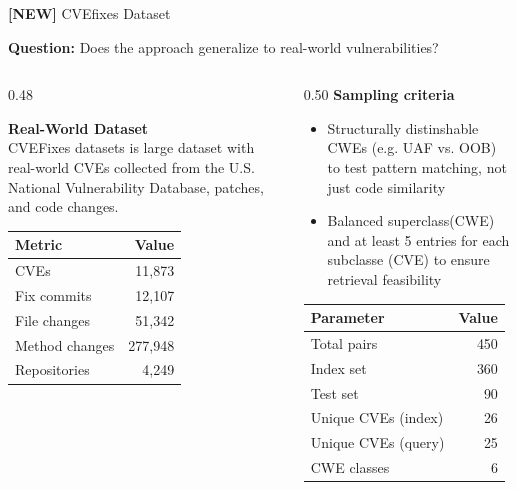 \documentclass[aspectratio=169,10pt]{beamer}
\begin{document}
\begin{frame}{\textbf{[NEW]} CVEfixes Dataset }
  
  \textbf{Question:} Does the approach generalize to real-world vulnerabilities?
  \vspace{0.3cm}
  
\begin{columns}[T]
\begin{column}{0.48\textwidth}

  \textbf{Real-World Dataset}\\[3pt]
  {\small CVEFixes datasets is large dataset with real-world CVEs collected from the U.S. National Vulnerability Database, patches, and code changes.\\}
  
  \vspace{0.5em}
  \begin{center}
    
  \scriptsize
  \begin{tabular}{lr}
    \toprule
    \textbf{Metric} & \textbf{Value} \\
    \midrule
    CVEs & 11,873 \\
    Fix commits & 12,107 \\
    File changes & 51,342 \\
    Method changes & 277,948 \\
    Repositories & 4,249 \\
    \bottomrule
  \end{tabular}
  \end{center}
\end{column}
\begin{column}{0.50\textwidth}
    {\small\textbf{Sampling criteria}}\\[3pt]
  {\scriptsize
  \begin{itemize}\itemsep1pt
    \item Structurally distinshable CWEs (e.g. UAF vs. OOB) to test pattern matching, not just code similarity
    \item Balanced superclass(CWE) and at least 5 entries for each subclasse (CVE) to ensure retrieval feasibility
  \end{itemize}}
      \vspace{0.5em}
    \begin{center}

      {\scriptsize
      \renewcommand{\arraystretch}{1.2}
      \begin{tabular}{lr}
        \toprule
        \textbf{Parameter} & \textbf{Value} \\
          \midrule
            Total pairs & 450 \\
            Index set & 360 \\
            Test set & 90 \\
            Unique CVEs (index) & 26 \\
            Unique CVEs (query) & 25 \\
            CWE classes & 6 \\
          \bottomrule
      \end{tabular}}


\end{center}
\end{column}
\end{columns}
\end{frame}
\end{document}

